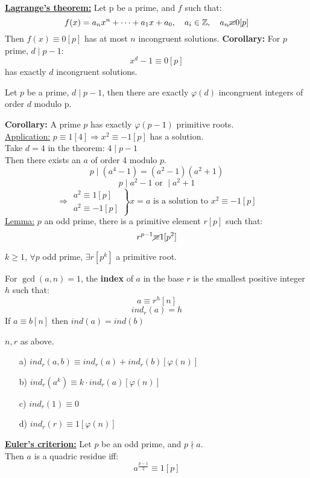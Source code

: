\documentclass{report}
\newcommand{\nequiv}{\cancel{\equiv}}
\begin{document}
\underline{\textbf{Lagrange's theorem:}} Let p be a prime, and $f$ such that:
\[f(x)=a_nx^n+\dots+a_1x+a_0,\quad a_i\in \mathbb{Z}, \quad a_n \nequiv 0[p]\]
Then  $f(x) \equiv 0[p]$ has at most $n$ incongruent solutions.
\textbf{Corollary:} For $p$ prime, $d\mid p-1$: \[x^d-1\equiv0[p]\]
has exactly $d$ incongruent solutions.
\begin{thm} Let $p$ be a prime, $d\mid p-1$, then there are exactly $\varphi(d)$ incongruent integers of order $d$ modulo p.
\end{thm}
\textbf{Corollary:} A prime $p$ has exactly $\varphi(p-1)$ primitive roots.\\
\underline{Application:} $p\equiv 1[4] \Rightarrow x^2\equiv -1[p]$ has a solution.\\
Take $d=4$ in the theorem: $4 \mid p-1$\\
Then there exists an $a$ of order 4 modulo $p$.\\
\[p \mid (a^4-1)=(a^2-1)(a^2+1)\]
\[p \mid a^2-1 \text{  or  } \mid a^2+1\]
\[\Rightarrow \left. \begin{array}{lcl}
a^2 \equiv 1[p]\\
a^2 \equiv -1[p]
\end{array}
\right \} x=a \text{ is a solution to   } x^2 \equiv -1[p]\]
\underline{Lemma:} $p$ an odd prime, there is a primitive element $r [p]$ such that:\\
\[r^{p-1} \nequiv 1[p^2]\]
\begin{thm} $k\geq 1$, $\forall p$ odd prime, $\exists r[p^k]$ a primitive root.
\end{thm}
\begin{defi} For $\gcd(a,n)=1$, the \textbf{index} of $a$ in the base $r$ is the smallest positive integer $h$ such that:\[a \equiv r^h[n] \]
	\[ind_r(a)=h\]
	If $a\equiv b[n]$ then $ind(a)=ind(b)$
\end{defi}
\begin{thm} $n,r$ as above.
	\begin{itemize}
		\item[a)] $ind_r(a,b)\equiv ind_r(a)+ind_r(b)[\varphi(n)]$
		\item[b)] $ind_r(a^k) \equiv k \cdot ind_r(a)[\varphi(n)]$
		\item[c)] $ind_r(1)\equiv 0$
		\item[d)] $ind_r(r)\equiv 1[\varphi(n)]$
	\end{itemize}			
\end{thm}
\underline{\textbf{Euler's criterion:}} Let $p$ be an odd prime, and $p \nmid a$. \\Then $a$ is a quadric residue iff:\[a^{\frac{p-1}{2}}\equiv 1[p]\]
\end{document}
